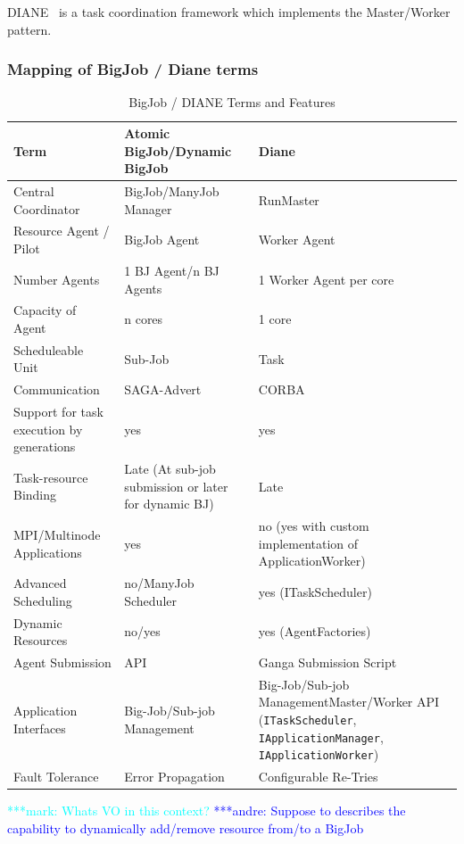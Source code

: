 \documentclass[]{article}
\newcommand{\alnote}[1]{ {\textcolor{blue} { ***andre: #1 }}}
\newcommand{\msnote}[1]{ {\textcolor{cyan} { ***mark: #1 }}}
\newcommand{\alnote}[1]{}
\begin{document}
DIANE~\cite{Moscicki:908910} is a task coordination framework which implements 
the Master/Worker pattern. 

\subsubsection{Mapping of BigJob / Diane terms}
\begin{table}[ht]
\centering
\begin{tabular}{|p{3.5cm}|p{5.9cm}|p{5.7cm}|}
\hline
\textbf{Term} &\textbf{Atomic BigJob/Dynamic BigJob} &\textbf{Diane}  \\
\hline
Central Coordinator &BigJob/ManyJob Manager & RunMaster \\ 
\hline
Resource Agent / Pilot &BigJob Agent  & Worker Agent \\
\hline
Number Agents &1 BJ Agent/n BJ Agents & 1 Worker Agent per core \\
\hline
Capacity of Agent &n cores & 1 core\\
\hline
Scheduleable Unit&Sub-Job &  Task \\
\hline
Communication &SAGA-Advert & CORBA\\
\hline
Support for task execution by generations  &yes &yes\\  
\hline
Task-resource Binding &Late (At sub-job submission or later for dynamic BJ) &Late\\
\hline
MPI/Multinode Applications &yes &no (yes with custom implementation of ApplicationWorker)\\
\hline
Advanced Scheduling &no/ManyJob Scheduler &yes (ITaskScheduler)\\
\hline
Dynamic Resources &no/yes &yes (AgentFactories)\\
\hline
Agent Submission &API &Ganga Submission Script\\
\hline
Application Interfaces &Big-Job/Sub-job Management &Big-Job/Sub-job 
Management\linebreak[4] Master/Worker API (\texttt{ITaskScheduler}, 
\texttt{IApplicationManager}, \texttt{IApplicationWorker}) \\
\hline
Fault Tolerance &Error Propagation &Configurable Re-Tries\\
\hline
\end{tabular}
\caption{BigJob / DIANE Terms and Features}
\end{table}

\msnote{Whats VO in this context?}\alnote{Suppose to describes the capability to dynamically add/remove resource from/to a BigJob}
\end{document}

